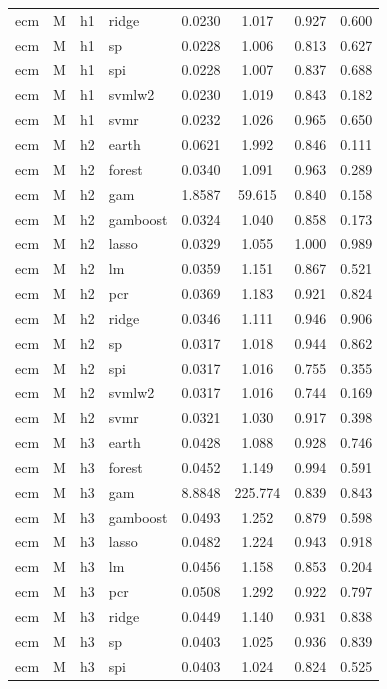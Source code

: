 \begin{ThreePartTable}
\begin{longtable}[t]{llclcccc}
ecm & M & h1 & ridge & 0.0230 & 1.017 & 0.927 & 0.600\\
ecm & M & h1 & sp & 0.0228 & 1.006 & 0.813 & 0.627\\
ecm & M & h1 & spi & 0.0228 & 1.007 & 0.837 & 0.688\\
ecm & M & h1 & svmlw2 & 0.0230 & 1.019 & 0.843 & 0.182\\
ecm & M & h1 & svmr & 0.0232 & 1.026 & 0.965 & 0.650\\
\addlinespace
ecm & M & h2 & earth & 0.0621 & 1.992 & 0.846 & 0.111\\
ecm & M & h2 & forest & 0.0340 & 1.091 & 0.963 & 0.289\\
ecm & M & h2 & gam & 1.8587 & 59.615 & 0.840 & 0.158\\
ecm & M & h2 & gamboost & 0.0324 & 1.040 & 0.858 & 0.173\\
ecm & M & h2 & lasso & 0.0329 & 1.055 & 1.000 & 0.989\\
ecm & M & h2 & lm & 0.0359 & 1.151 & 0.867 & 0.521\\
ecm & M & h2 & pcr & 0.0369 & 1.183 & 0.921 & 0.824\\
ecm & M & h2 & ridge & 0.0346 & 1.111 & 0.946 & 0.906\\
ecm & M & h2 & sp & 0.0317 & 1.018 & 0.944 & 0.862\\
ecm & M & h2 & spi & 0.0317 & 1.016 & 0.755 & 0.355\\
ecm & M & h2 & svmlw2 & 0.0317 & 1.016 & 0.744 & 0.169\\
ecm & M & h2 & svmr & 0.0321 & 1.030 & 0.917 & 0.398\\
\addlinespace
ecm & M & h3 & earth & 0.0428 & 1.088 & 0.928 & 0.746\\
ecm & M & h3 & forest & 0.0452 & 1.149 & 0.994 & 0.591\\
ecm & M & h3 & gam & 8.8848 & 225.774 & 0.839 & 0.843\\
ecm & M & h3 & gamboost & 0.0493 & 1.252 & 0.879 & 0.598\\
ecm & M & h3 & lasso & 0.0482 & 1.224 & 0.943 & 0.918\\
ecm & M & h3 & lm & 0.0456 & 1.158 & 0.853 & 0.204\\
ecm & M & h3 & pcr & 0.0508 & 1.292 & 0.922 & 0.797\\
ecm & M & h3 & ridge & 0.0449 & 1.140 & 0.931 & 0.838\\
ecm & M & h3 & sp & 0.0403 & 1.025 & 0.936 & 0.839\\
ecm & M & h3 & spi & 0.0403 & 1.024 & 0.824 & 0.525\\

\end{longtable}
\end{ThreePartTable}

